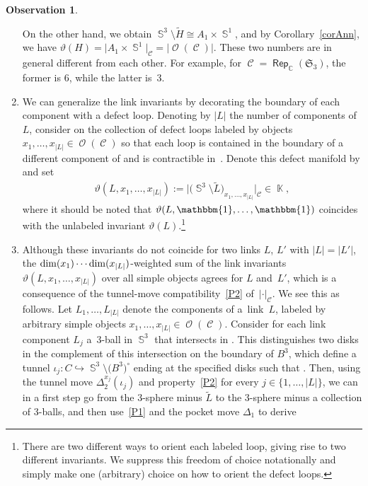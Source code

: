 \documentclass[pdftex]{sigma}
\DeclareMathOperator{\Rep}{\mathsf{Rep}}
\DeclareMathOperator{\K}{\mathbb{K}}
\DeclareMathOperator{\C}{\mathbb{C}}
\DeclareMathOperator{\Sp}{\mathbb{S}}
\DeclareMathOperator{\calc}{\mathcal{C}}
\DeclareMathOperator{\calo}{\mathcal{O}}
\numberwithin{equation}{section}
\theoremstyle{definition}
\newtheorem{Observation}[Observation]{Observation}
\begin{document}
\begin{Observation}
\begin{enumerate}
 On the other hand, we obtain $\Sp^3\setminus \widetilde{H} \cong A_1 \times \Sp^1$, and by Corollary~\ref{corAnn}, we have $\vartheta(H) = \bigl|A_1 \times \Sp^1\bigr|_{\calc} = |\calo(\calc)|$. These two numbers are in general different from each other. For example, for $\calc = \Rep_{\C}(\mathfrak{S}_3)$, the former is 6, while the latter is~3.
 \item We can generalize the link invariants by decorating the boundary of each component with a defect loop. Denoting by $|L|$ the number of components of~$L$, consider on \smash{$\partial\bigl(\Sp^3 \setminus \widetilde{L}\bigr)$} the collection of defect loops labeled by objects $x_1, \dots, x_{|L|} \in \calo(\calc)$ so that each loop is contained in the boundary of a different component of  and is contractible in~. Denote this defect manifold by \smash{$\bigl(\Sp^3 \setminus \widetilde{L}\bigr)_{x_1, \dots, x_{|L|}}$} and set
 \begin{align*}
 \vartheta(L, x_1, \dots, x_{|L|}) :=\bigl|\bigl(\Sp^3 \setminus \widetilde{L}\bigr)_{x_1, \dots, x_{|L|}}\bigr|_{\calc} \in \K,
 \end{align*}
 where it should be noted that $\vartheta(L, \mathbbm{1}, \dots, \mathbbm{1})$ coincides with the unlabeled invariant $\vartheta(L)$.\footnote{There are two different ways to orient each labeled loop, giving rise to two different invariants. We suppress this freedom of choice notationally and simply make one (arbitrary) choice on how to orient the defect loops.}
 \item Although these invariants do not coincide for two links $L$, $L'$ with $|L| = |L'|$, the $\dim(x_1) \cdots \linebreak \dim(x_{|L|})$-weighted sum of the link invariants $\vartheta(L, x_1, \dots, x_{|L|})$ over all simple objects agrees for $L$ and~$L'$, which is a consequence of the tunnel-move compatibility~\ref{P2} of~$| \cdot|_{\calc}$. We see this as follows. Let $L_1, \dots, L_{|L|}$ denote the components of a~link~$L$, labeled by arbitrary simple objects $x_1, \dots, x_{|L|} \in \calo(\calc)$. Consider for each link component $L_j$ a~3\nobreakdash-ball  in $\Sp^3$ that intersects  in \smash{$B^3 \cap \partial\widetilde{L_j} \cong \Sp^1 \times I$}. This distinguishes two disks in the complement of this intersection on the boundary of $B^3$, which define a tunnel $\iota_j\colon C \hookrightarrow \Sp^3 \setminus \bigl(B^3\bigr)^{\circ}$ ending at the specified disks such that . Then, using the tunnel move $\Delta_2^{x_j}(\iota_j)$ and property~\ref{P2} for every $j \in \{1, \dots, |L|\}$, we can in a first step go from the 3-sphere minus $\widetilde{L}$ to the 3-sphere minus a collection of 3-balls, and then use~\ref{P1} and the pocket move $\Delta_1$ to derive

\end{enumerate}
\end{Observation}
\end{document}
